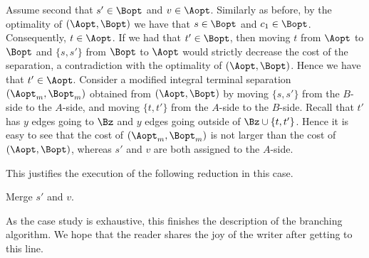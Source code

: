 Assume second that $s'\in \Bopt$ and $v\in \Aopt$. Similarly as before, by the optimality of $(\Aopt,\Bopt)$ we have that $s\in \Bopt$ and $c_1\in \Bopt$. Consequently, $t\in \Aopt$. If we had that $t'\in \Bopt$, then moving $t$ from $\Aopt$ to $\Bopt$ and $\{s,s'\}$ from $\Bopt$ to $\Aopt$ would strictly decrease the cost of the separation, a contradiction with the optimality of $(\Aopt,\Bopt)$. Hence we have that $t'\in \Aopt$. Consider a modified integral terminal separation $(\Aopt_m,\Bopt_m)$ obtained from $(\Aopt,\Bopt)$ by moving $\{s,s'\}$ from the $B$-side to the $A$-side, and moving $\{t,t'\}$ from the $A$-side to the $B$-side. Recall that $t'$ has $y$ edges going to $\Bz$ and $y$ edges going outside of $\Bz\cup \{t,t'\}$. Hence it is easy to see that the cost of $(\Aopt_m,\Bopt_m)$ is not larger than the cost of $(\Aopt,\Bopt)$, whereas $s'$ and $v$ are both assigned to the $A$-side.

This justifies the execution of the following reduction in this case.

\begin{reductionstep}
Merge $s'$ and $v$.
\end{reductionstep}

As the case study is exhaustive, this finishes the description of the branching algorithm. We hope that the reader shares the joy of the writer after getting to this line.




